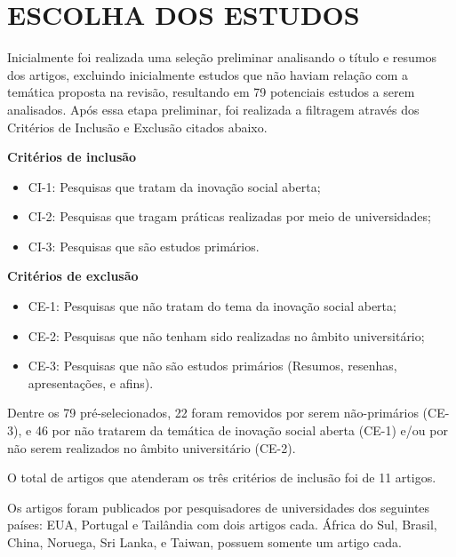 

\section{ESCOLHA DOS ESTUDOS}

Inicialmente foi realizada uma seleção preliminar analisando o título e resumos dos artigos, excluindo inicialmente estudos que não haviam relação com a temática proposta na revisão, resultando em 79 potenciais estudos a serem analisados. Após essa etapa preliminar, foi realizada a filtragem através dos Critérios de Inclusão e Exclusão citados abaixo.

\par\vspace{1\baselineskip}

\textbf{Critérios de inclusão}
\begin{itemize}
    \item CI-1: Pesquisas que tratam da inovação social aberta;
    \item CI-2: Pesquisas que tragam práticas realizadas por meio de universidades;
    \item CI-3: Pesquisas que são estudos primários.
\end{itemize}

\par\vspace{1\baselineskip}

\textbf{Critérios de exclusão}
\begin{itemize}
    \item CE-1: Pesquisas que não tratam do tema da inovação social aberta;
    \item CE-2: Pesquisas que não tenham sido realizadas no âmbito universitário;
    \item CE-3: Pesquisas que não são estudos primários (Resumos, resenhas, apresentações, e afins).
\end{itemize}

Dentre os 79 pré-selecionados, 22 foram removidos por serem não-primários (CE-3), e 46 por não tratarem da temática de inovação social aberta (CE-1) e/ou por não serem realizados no âmbito universitário (CE-2). 

O total de artigos que atenderam os três critérios de inclusão foi de 11 artigos.



Os artigos foram publicados por pesquisadores de universidades dos seguintes países: EUA, Portugal e Tailândia com dois artigos cada. África do Sul, Brasil, China, Noruega, Sri Lanka, e Taiwan, possuem somente um artigo cada.

